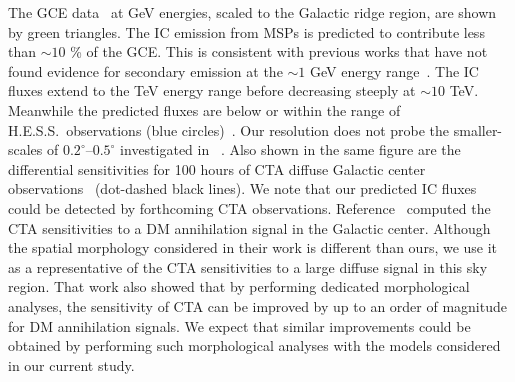 \documentclass[doublespace,nopageskip]{VTthesis} %
\begin{document}
The GCE data~\cite{2015MNRAS.451.1833M} at GeV energies, scaled to the Galactic ridge region, are shown by green triangles. The IC emission from MSPs is predicted to contribute less than $\sim 10$ \% of the GCE. This is consistent with previous works that have not found evidence for secondary emission at the $\sim 1$ GeV energy range~\cite{2016PhRvD..93j3004L}. The IC fluxes extend to the TeV energy range before decreasing steeply at $\sim 10$ TeV. Meanwhile the predicted fluxes are below or within the range of H.E.S.S.~observations (blue circles)~\cite{2006Natur.439..695A}. Our resolution does not probe the smaller-scales of $0.2^\circ$--$0.5^\circ$ investigated in ~\citet{2018PhRvD..98d3005H}. Also shown in the same figure are the differential sensitivities for 100 hours of CTA diffuse Galactic center observations~\cite{2015JCAP...03..055S} (dot-dashed black lines). We note that our predicted IC fluxes could be detected by forthcoming CTA observations. Reference~\cite{2015JCAP...03..055S} computed the CTA sensitivities to a DM annihilation signal in the Galactic center. Although the spatial morphology considered in their work is different than ours, we use it as a representative of the CTA sensitivities to a large diffuse signal in this sky region. That work also showed that by performing dedicated morphological analyses, the sensitivity of CTA can be improved by up to an order of magnitude for DM annihilation signals. We expect that similar improvements could be obtained by performing such morphological analyses with the models considered in our current study.
\end{document}
